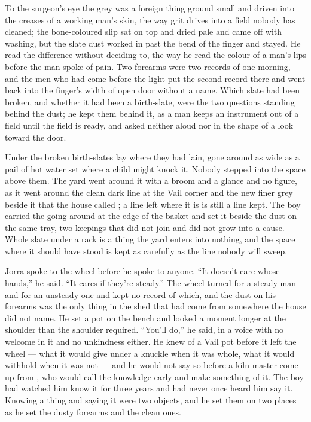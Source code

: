 To the surgeon's eye the grey was a foreign thing ground small and driven into the creases of a working man's skin, the way grit drives into a field nobody has cleaned; the bone-coloured slip sat on top and dried pale and came off with washing, but the slate dust worked in past the bend of the finger and stayed. He read the difference without deciding to, the way he read the colour of a man's lips before the man spoke of pain. Two forearms were two records of one morning, and the men who had come before the light put the second record there and went back into the finger's width of open door without a name. Which slate had been broken, and whether it had been a birth-slate, were the two questions standing behind the dust; he kept them behind it, as a man keeps an instrument out of a field until the field is ready, and asked neither aloud nor in the shape of a look toward the door.

Under  the broken birth-slates lay where they had lain, gone around as wide as a pail of hot water set where a child might knock it. Nobody stepped into the space above them. The yard went around it with a broom and a glance and no figure, as it went around the clean dark line at the Vail corner and the new finer grey beside it that the house called ; a line left where it is is still a line kept. The boy carried the going-around at the edge of the basket and set it beside the dust on the same tray, two keepings that did not join and did not grow into a cause. Whole slate under a rack is a thing the yard enters into nothing, and the space where it should have stood is kept as carefully as the line nobody will sweep.

Jorra spoke to the wheel before he spoke to anyone. “It doesn't care whose hands,” he said. “It cares if they're steady.” The wheel turned for a steady man and for an unsteady one and kept no record of which, and the dust on his forearms was the only thing in the shed that had come from somewhere the house did not name. He set a pot on the bench and looked a moment longer at the shoulder than the shoulder required. “You'll do,” he said, in a voice with no welcome in it and no unkindness either. He knew  of a Vail pot before it left the wheel --- what it would give under a knuckle when it was whole, what it would withhold when it was not --- and he would not say so before a kiln-master come up from , who would call the knowledge early and make something of it. The boy had watched him know it for three years and had never once heard him say it. Knowing a thing and saying it were two objects, and he set them on two places as he set the dusty forearms and the clean ones.

